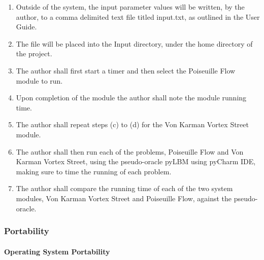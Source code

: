 \documentclass[12pt, titlepage]{article}
\begin{document}
\begin{enumerate}
\begin{enumerate}
\item Outside of the system, the input parameter values will be written, by the
author, to a comma delimited text file titled input.txt, as outlined in the User
Guide.
\item The file will be placed into the Input directory, under the home directory
of the project.
\item The author shall first start a timer and then select the Poiseuille Flow
module to run.
\item Upon completion of the module the author shall note the module running
time.
\item The author shall repeat steps (c) to (d) for the Von Karman Vortex Street
module.
\item The author shall then run each of the problems, Poiseuille Flow and Von
Karman Vortex Street, using the pseudo-oracle pyLBM using pyCharm IDE, making
sure to time the running of each problem.
\item The author shall compare the running time of each of the two system
modules, Von Karman Vortex Street and Poiseuille Flow, against the
pseudo-oracle.
\end{enumerate}

\end{enumerate}

\subsubsection{Portability}
		
\paragraph{Operating System Portability}
\end{document}
